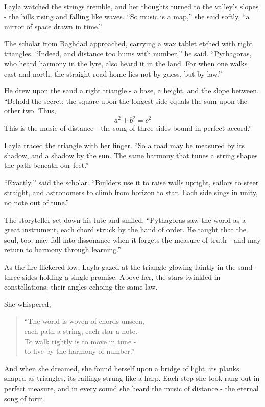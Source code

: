 \documentclass[
  letterpaper,
  DIV=11,
  numbers=noendperiod]{scrreprt}
\begin{document}
Layla watched the strings tremble, and her thoughts turned to the
valley's slopes - the hills rising and falling like waves. ``So music is
a map,'' she said softly, ``a mirror of space drawn in time.''

The scholar from Baghdad approached, carrying a wax tablet etched with
right triangles. ``Indeed, and distance too hums with number,'' he said.
``Pythagoras, who heard harmony in the lyre, also heard it in the land.
For when one walks east and north, the straight road home lies not by
guess, but by law.''

He drew upon the sand a right triangle - a base, a height, and the slope
between. ``Behold the secret: the square upon the longest side equals
the sum upon the other two. Thus, \[
a^2 + b^2 = c^2
\] This is the music of distance - the song of three sides bound in
perfect accord.''

Layla traced the triangle with her finger. ``So a road may be measured
by its shadow, and a shadow by the sun. The same harmony that tunes a
string shapes the path beneath our feet.''

``Exactly,'' said the scholar. ``Builders use it to raise walls upright,
sailors to steer straight, and astronomers to climb from horizon to
star. Each side sings in unity, no note out of tune.''

The storyteller set down his lute and smiled. ``Pythagoras saw the world
as a great instrument, each chord struck by the hand of order. He taught
that the soul, too, may fall into dissonance when it forgets the measure
of truth - and may return to harmony through learning.''

As the fire flickered low, Layla gazed at the triangle glowing faintly
in the sand - three sides holding a single promise. Above her, the stars
twinkled in constellations, their angles echoing the same law.

She whispered,

\begin{quote}
``The world is woven of chords unseen,\\
each path a string, each star a note.\\
To walk rightly is to move in tune -\\
to live by the harmony of number.''
\end{quote}

And when she dreamed, she found herself upon a bridge of light, its
planks shaped as triangles, its railings strung like a harp. Each step
she took rang out in perfect measure, and in every sound she heard the
music of distance - the eternal song of form.
\end{document}
